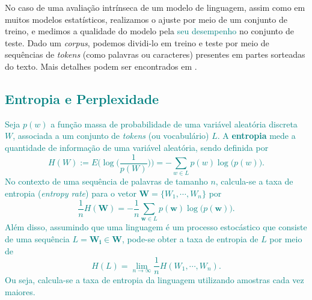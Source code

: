 \documentclass{automatextcc}
\newcommand{\nico}[1]{\textcolor{teal}{#1}}
\newcommand{\bs}[1]{\boldsymbol{#1}}
\begin{document}
No caso de uma avaliação intrínseca de um modelo de linguagem, assim como em muitos modelos estatísticos, realizamos o ajuste por meio de um conjunto de treino, e medimos a qualidade do modelo pela \nico{seu desempenho} no conjunto de teste. Dado um \textit{corpus}, podemos dividi-lo em treino e teste por meio de sequências de \textit{tokens} (como palavras ou caracteres) presentes em partes sorteadas do texto. Mais detalhes podem ser encontrados em \citet{goldberg2017, jurafsky2021}.




\subsection{\nico{Entropia e Perplexidade}}
\label{entropia e perplexidade}

\nico{Seja $p(w)$ a função massa de probabilidade de uma variável aleatória discreta $W$, associada a um conjunto de \textit{tokens} (ou vocabulário) $L$. A \textbf{entropia} mede a quantidade de informação de uma variável aleatória, sendo definida por
\begin{equation*}
    H(W) := E \biggl(\log \biggl( \frac{1}{p(W)} \biggl) \biggl) = - \sum_{w \in L} p(w) \log \big(p(w)\big). 
\end{equation*}
No contexto de uma sequência de palavras de tamanho $n$, calcula-se a taxa de entropia (\textit{entropy rate}) para o vetor $\bs{W} = \{ W_1, \cdots, W_n \}$ por
\begin{equation*}
    \frac{1}{n} H(\bs{W}) = - \frac{1}{n} \sum_{\bs{w} \in L} p(\bs{w}) \log \big(p(\bs{w})\big). 
\end{equation*}
Além disso, assumindo que uma linguagem é um processo estocástico que consiste de uma sequência $L = \bs{W_i} \in \bs{W}$, pode-se obter a taxa de entropia de $L$ por meio de
\begin{equation*}
    H(L) = \lim_{n \rightarrow \infty} \frac{1}{n} H(W_1,\cdots,W_n). 
\end{equation*}
Ou seja, calcula-se a taxa de entropia da linguagem utilizando amostras cada vez maiores.
}


\end{document}
